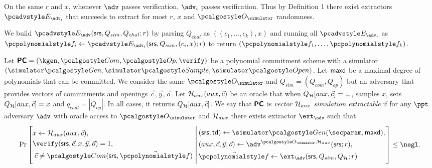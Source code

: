 \documentclass[runningheads,11pt]{llncs}
\let\spvec\vec \let\vec\accentvec
\let\vec\spvec
\begin{document}
On the same $r$ and $x$, whenever $\adv$ passes verification, $\adv_{i}$ passes verification.  Thus by Definition 1 there exist extractors $\Ext_{\adv_{i}}$ that succeeds to extract for most $r$, $x$ and $\oracles$ randomness.

We build $\Ext_{\adv}(\srs, Q_{sim}, Q_{chal}; r)$ by parsing $Q_{chal}$ as $((c_{1},\dots, c_{k}), x)$ and running all $\Ext_{\adv_{i}}$ as $\p{f}_{i}\gets \Ext_{\adv_{i}}(\srs,Q_{sim},(c_{i},x); r)$ to return $(\p{f}_{1},\dots,\p{f}_{k})$.

\begin{definition}
  \label{def:sepcom}
  Let $\PCOM = (\kgen, \com, \open, \verify)$ be a polynomial commitment
  scheme with a simulator $(\simgen, \simsample, \simopen)$. Let $\mathsf{maxd}$ be a maximal degree of polynomials that can be
  committed.
  We consider the same $\oracles$ and $Q_{sim}= (Q_{com},Q_{op})$ but an adversary that provides vectors of commitments and openings $\vec{c}, \vec{y}, \vec{o}$.
   Let $\ro_{aux}(aux,\vec{c})$ be an oracle that when $Q_{\ro}[aux,\vec{c}] = \bot$, samples $x$, sets $Q_{\ro}[aux,\vec{c}]=x$ and $q_{{chal}}= |Q_{{op}}|$. In all cases, it returns $Q_{\ro}[aux,\vec{c}]$.
  We say that $\bm{\mathsf{PC}}$ is \emph{vector $\mathcal{H}_{aux}$ simulation extractable} if for any $\ppt$
  adversary $\adv$ with oracle access to $\oracles$ and $\mathcal{H}_{aux}$ there exists extractor
  $\ext_{\adv}$ such that
\[
  \Pr \left[
    \begin{aligned}
      & x \gets \ro_{aux}(aux,\vec{c}), \\
      & \verify(\srs, \vec{c}, x, \vec{y}, \vec{o}) = 1, \\
      & \;\vec{c} \neq \com(\srs, \vec{\p{f}})\\
    \end{aligned}
    \,\left|\,
      \vphantom{
        \begin{aligned}
          & \\
          & \\
          & \\
          &
        \end{aligned}
        }
    \begin{aligned}
      & (\srs, \td) \gets \simgen(\secparam, \maxdeg),\\
      & (aux,\vec{c},\vec{y}, \vec{o}) \gets \adv^{\oracles,\ro_{aux}}(\srs; r), \\
      & \vec{\p{f}} \gets \ext_\adv(\srs, Q_{sim}, Q_{\ro}; r)
    \end{aligned}
  \right.\right]
  \leq \negl.
\]
\end{definition}
\end{document}
